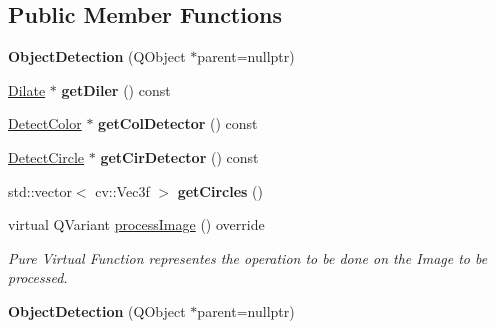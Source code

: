 \subsection*{Public Member Functions}
\begin{DoxyCompactItemize}
\item 
\mbox{\label{class_image_processor_1_1_object_detection_ab80e0235c8882a62f21faea4796b325f}} 
{\bfseries Object\+Detection} (Q\+Object $\ast$parent=nullptr)
\item 
\mbox{\label{class_image_processor_1_1_object_detection_a2b5e3886ae9770e412cc4d21dfe031dd}} 
\hyperlink{class_image_processor_1_1_dilate}{Dilate} $\ast$ {\bfseries get\+Diler} () const
\item 
\mbox{\label{class_image_processor_1_1_object_detection_a65da5b494041b0da792dd01a90bcf065}} 
\hyperlink{class_image_processor_1_1_detect_color}{Detect\+Color} $\ast$ {\bfseries get\+Col\+Detector} () const
\item 
\mbox{\label{class_image_processor_1_1_object_detection_a8a9535796772b425c44fd5a318adbe5f}} 
\hyperlink{class_image_processor_1_1_detect_circle}{Detect\+Circle} $\ast$ {\bfseries get\+Cir\+Detector} () const
\item 
\mbox{\label{class_image_processor_1_1_object_detection_aa0f939d2dcf5ec755be433db03fafda6}} 
std\+::vector$<$ cv\+::\+Vec3f $>$ {\bfseries get\+Circles} ()
\item 
virtual Q\+Variant \hyperlink{class_image_processor_1_1_object_detection_ac5561650d95eac1672e2d049ed36201d}{process\+Image} () override
\begin{DoxyCompactList}\small\item\em Pure Virtual Function representes the operation to be done on the Image to be processed. \end{DoxyCompactList}\item 
\mbox{\label{class_image_processor_1_1_object_detection_ad1197739e0daec4c336f17b280e8eb9b}} 
{\bfseries Object\+Detection} (Q\+Object $\ast$parent=nullptr)

\end{DoxyCompactItemize}
